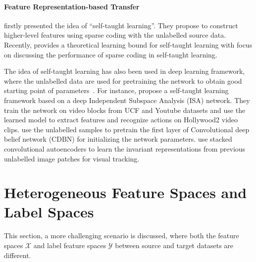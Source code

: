 \documentclass[prodmode]{acmsmall}  %
\begin{document}
\paragraph{Feature Representation-based Transfer}
\label{sec:selftaught}
 firstly presented the idea of ``self-taught learning''. They propose to construct higher-level features using sparse coding with the unlabelled source data. Recently,  provides a theoretical learning bound for self-taught learning with focus on discussing the performance of sparse coding in self-taught learning. 

The idea of self-taught learning has also been used in deep learning framework, where the unlabelled data are used for pretraining the network to obtain good starting point of parameters~\cite{Le2011,Gan2014,Kuen2015}. For instance,  propose a self-taught learning framework based on a deep Independent Subspace Analysis (ISA) network. They train the network on video blocks from UCF and Youtube datasets and use the learned model to extract features and recognize actions on Hollywood2 video clips.  use the unlabelled samples to pretrain the first layer of Convolutional deep belief network (CDBN) for initializing the network parameters.  use stacked convolutional autoencoders to learn the invariant representations from previous unlabelled image patches for visual tracking. 

\section{Heterogeneous Feature Spaces and Label Spaces}
\label{sec:HETEFL}
This section, a more challenging scenario is discussed, where both the feature spaces $\mathcal{X}$ and label feature spaces $\mathcal{Y}$ between source and target datasets are different.
\end{document}
